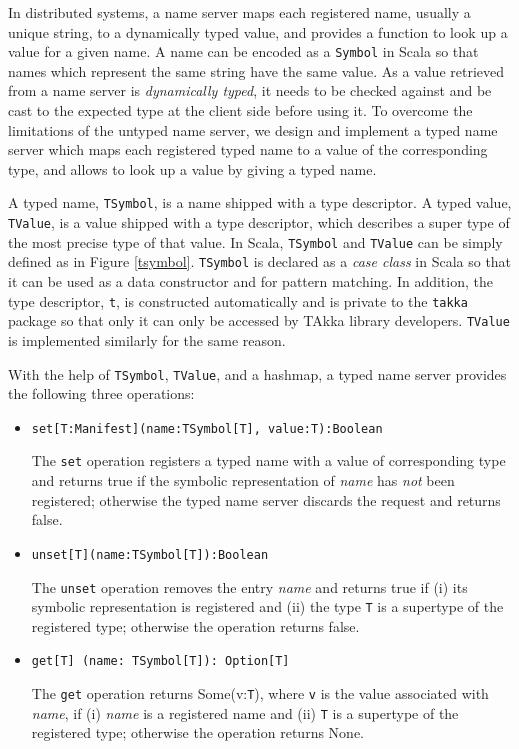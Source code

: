 In distributed systems, a name server maps each registered name, usually a
unique string, to a dynamically typed value, and provides a function to look up 
a value for a
given name. A name can be encoded as a {\tt Symbol} in Scala so that names
which represent the same string have the same value.  As a value retrieved from 
a name server is {\it dynamically typed}, it needs to be checked against and be 
cast to the expected type at the client side before using it.
To overcome the limitations of the untyped name server, we design and implement
a typed name server which maps each registered typed name to a value of the
corresponding type, and allows to look up a value by giving a typed name.

A typed name, {\tt TSymbol}, is a name shipped with a type descriptor.  A 
typed value, {\tt TValue}, is a value shipped with a type descriptor, which
describes a super type of the most precise type of that value.  
In Scala, {\tt TSymbol} and {\tt TValue} can be simply defined as in Figure
\ref{tsymbol}.  {\tt TSymbol} is declared as a {\it case class} in Scala so 
that it can be used as a data constructor and for pattern matching.  In 
addition, the type descriptor, {\tt t}, is constructed automatically and is 
private to the {\tt takka} package so that only it can only be accessed by TAkka 
library developers. {\tt TValue} is implemented similarly for the same reason.

With the help of {\tt TSymbol}, {\tt TValue}, and a hashmap, a typed name 
server provides the following three operations:




\begin{itemize}
  \item {\tt set[T:Manifest](name:TSymbol[T], value:T):Boolean}

The {\tt set} operation registers a typed name with a value of corresponding 
type and returns true if the symbolic representation of {\it name} has {\it 
not} been registered; otherwise the typed name server discards the request and
returns false.

  \item {\tt unset[T](name:TSymbol[T]):Boolean}

The {\tt unset} operation removes the entry {\it name} and returns true if (i) 
its symbolic representation is registered and (ii) the type {\tt T} is a 
supertype of the registered type; otherwise the operation returns false.

  \item {\tt get[T] (name: TSymbol[T]): Option[T]}

The {\tt get} operation returns Some(v:{\tt T}), where {\tt v} is the value 
associated with {\it name}, if (i) {\it name} is a registered name and (ii) 
{\tt T} is a supertype of the registered type; otherwise the operation returns 
None.

\end{itemize}

